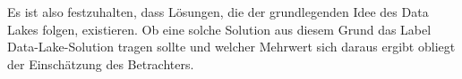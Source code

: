 \documentclass[twoside,twocolumn]{article}
\begin{document}
Es ist also festzuhalten, dass Lösungen, die der grundlegenden Idee des Data Lakes folgen, existieren. Ob eine solche Solution aus diesem Grund das Label Data-Lake-Solution tragen sollte und welcher Mehrwert sich daraus ergibt obliegt der Einschätzung des Betrachters.










\end{document}
